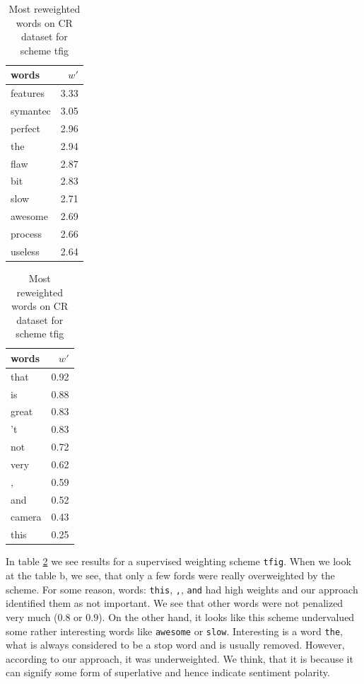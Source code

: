 \begin{table}[H]
    \centering
    \begin{minipage}{.4\linewidth}
      \centering
        \begin{tabular}{lr}
\toprule
    words &  $w'$ \\
\midrule
 features &  3.33 \\
 symantec &  3.05 \\
  perfect &  2.96 \\
      the &  2.94 \\
     flaw &  2.87 \\
      bit &  2.83 \\
     slow &  2.71 \\
  awesome &  2.69 \\
  process &  2.66 \\
  useless &  2.64 \\
\bottomrule
\end{tabular}

    \end{minipage}
    \begin{minipage}{.4\linewidth}
      \centering
        \begin{tabular}{lr}
\toprule
  words &  $w'$ \\
\midrule
   that &  0.92 \\
     is &  0.88 \\
  great &  0.83 \\
     't &  0.83 \\
    not &  0.72 \\
   very &  0.62 \\
      , &  0.59 \\
    and &  0.52 \\
 camera &  0.43 \\
   this &  0.25 \\
\bottomrule
\end{tabular}

    \end{minipage} 
    \caption{Most reweighted words on CR dataset for scheme tfig}
    \label{tab:words:CR:tfig}
\end{table}

    In table \ref{tab:words:CR:tfig} we see results for a supervised weighting scheme \texttt{tfig}.
    When we look at the table b, we see, that only a few fords were really overweighted by the scheme. 
    For some reason, words: \texttt{this}, \texttt{,}, \texttt{and} had high weights and our approach identified them as not important.
    We see that other words were not penalized very much ($0.8$ or $0.9$).
    On the other hand, it looks like this scheme undervalued some rather interesting words like \texttt{awesome} or \texttt{slow}.
    Interesting is a word \texttt{the}, what is always considered to be a stop word and is usually removed. 
    However, according to our approach, it was underweighted. 
    We think, that it is because it can signify some form of superlative and hence indicate sentiment polarity.
    


